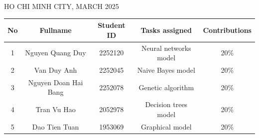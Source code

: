 \begin{titlepage}
\begin{table}[h]
\begin{tabular}{rrll}
\end{tabular}
\end{table}

\vspace{3cm}

\begin{center}
{\footnotesize HO CHI MINH CITY, MARCH 2025}
\end{center}

\end{titlepage}



\newpage
\begin{table}[h!]
\raggedright

\begin{tabular}{|c|c|c|c|c|} 
\hline
 No & Fullname & Student ID & Tasks assigned & Contributions\\ [1ex] 
 \hline
 1 & Nguyen Quang Duy & 2252120 & Neural networks model & 20\% \\ 
 2 & Van Duy Anh & 2252045 & Naive Bayes model & 20\% \\
 3 & Nguyen Doan Hai Bang & 2252078 & Genetic algorithm  & 20\%\\
 4 & Tran Vu Hao & 2052978 & Decision trees model & 20\% \\
 5 & Dao Tien Tuan & 1953069 & Graphical model & 20\% \\ [1ex] 
 \hline
\end{tabular}

\label{table:1}
\end{table}
\newpage
\tableofcontents
